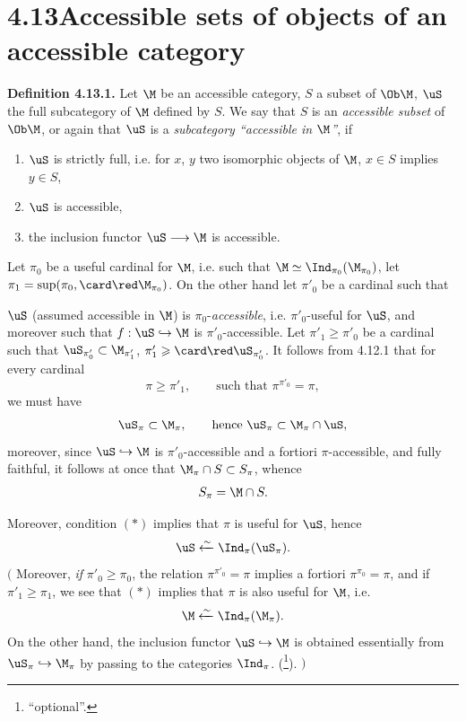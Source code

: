 
\section*{4.13\quad Accessible sets of objects of an accessible category}

\textbf{Definition 4.13.1.} Let $\M$ be an accessible category, $S$ a subset of $\Ob\M$, $\uS$ the full subcategory of $\M$ defined by $S$. We say that $S$ is an \textit{accessible subset} of $\Ob\M$, or again that $\uS$ is a \textit{subcategory ``accessible in $\M$''}, if
\begin{enumerate}
\item[a)] $\uS$ is strictly full, i.e. for $x$, $y$ two isomorphic objects of $\M$, $x \in S$ implies $y \in S$,
\item[b)] $\uS$ is accessible,
\item[c)] the inclusion functor $\uS \longrightarrow \M$ is accessible.
\end{enumerate}
Let $\pi_0$ be a useful cardinal for $\M$, i.e. such that $\M \simeq \Ind_{\pi_0}(\M_{\pi_0})$, let $\pi_1 = \sup(\pi_0, \card\red\M_{\pi_0})$. On the other hand let $\pi'_0$ be a cardinal such that

$\uS$ (assumed accessible in $\M$) is $\pi_0$-\textit{accessible}, i.e. $\pi'_0$-useful for $\uS$, and moreover such %
that $f : \uS \hookrightarrow \M$ is $\pi'_0$-accessible. Let $\pi'_1 \geqslant \pi'_0$ be a cardinal such that $\uS_{\pi'_0} \subset \M_{\pi'_1}$, $\pi'_1 \geqslant \card\red\uS_{\pi'_0}$. It follows from 4.12.1 that for every cardinal
\[
\pi \geqslant \pi'_1 , \qquad \text{such that } \pi^{\pi'_0} = \pi, \tag*{$(*)$}
\]
we must have
\[
\uS_\pi \subset \M_\pi , \qquad \text{hence } \uS_\pi \subset \M_\pi \cap \uS,
\]
moreover, since $\uS \hookrightarrow \M$ is $\pi'_0$-accessible and a fortiori $\pi$-accessible, and fully faithful, it follows at once that $\M_\pi \cap S \subset S_\pi$, whence
\[
S_\pi = \M \cap S . %
\]

Moreover, condition $(*)$ implies that $\pi$ is useful for $\uS$, hence
\[
\uS \xleftarrow{\sim} \Ind_\pi(\uS_\pi) .
\]
$\Big($ Moreover, \textit{if} $\pi'_0 \geqslant \pi_0$, the relation $\pi^{\pi'_0} = \pi$ implies a fortiori $\pi^{\pi_0} = \pi$, and if $\pi'_1 \geqslant \pi_1$, we see that $(*)$ implies that $\pi$ is also useful for $\M$, i.e.
\[
\M \xleftarrow{\sim} \Ind_\pi(\M_\pi) .
\]
On the other hand, the inclusion functor $\uS \hookrightarrow \M$ is obtained essentially from $\uS_\pi \hookrightarrow \M_\pi$ by passing to the categories $\Ind_\pi$. (\footnote[116]{ ``optional''.}). $\Big)$

